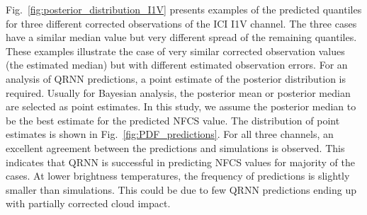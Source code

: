 \documentclass[amt, manuscript]{copernicus}
\begin{document}
Fig.~\ref{fig:posterior_distribution_I1V} presents examples of the predicted quantiles for three different corrected observations of the ICI I1V channel. The three cases have a similar median value but very different spread of the remaining quantiles. These examples illustrate the case of very similar corrected observation values (the estimated median) but with different estimated observation errors.
For an analysis of QRNN predictions, a point estimate of the posterior distribution is required. Usually for Bayesian analysis, the posterior mean or posterior median are selected as point estimates. In this study, we assume the posterior median to be the best estimate for the predicted NFCS value. The distribution of point estimates is shown in Fig.~\ref{fig:PDF_predictions}. For all three channels, an excellent agreement between the predictions and simulations is observed. This indicates that QRNN is successful in predicting NFCS values for majority of the cases. At lower brightness temperatures, the frequency of predictions is slightly smaller than simulations. This could be due to few QRNN predictions ending up with partially corrected cloud impact. 
 
\end{document}
